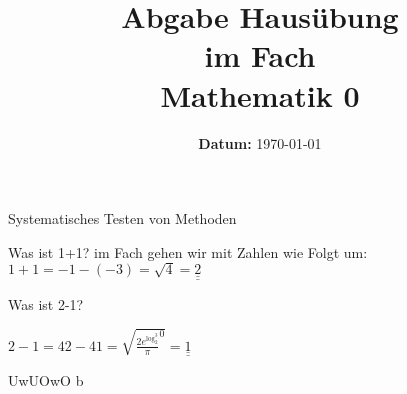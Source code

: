 \documentclass[ngerman]{Tuda_Hausuebung}
\date{\textbf{\sffamily Datum:} \today}
\begin{document}
\title[Mathe 0]{Abgabe Hausübung\\im Fach\\ Mathematik 0}
\maketitle{}
\printGradeTable{} %

\begin{task}[points=8,solution=true]{\mdseries Systematisches Testen von Methoden}
    \begin{cpenumerate}[label=\alph*)]
        \item Was ist 1+1?
        im Fach \getShortTitle{} gehen wir mit Zahlen wie Folgt um:
        $1+1=-1-(-3)=\sqrt{4}=\underline{\underline{2}}$
        \item Was ist 2-1?

        $2-1=42-41=\sqrt{\frac{2e^{\log_{2}^3}}{\pi}^{0}}=\underline{\underline{1}}$

    \end{cpenumerate}
\end{task}
\begin{task}[points=2,solution=true]{UwUOwO}
    b
\end{task}
\clearpage
\end{document}
